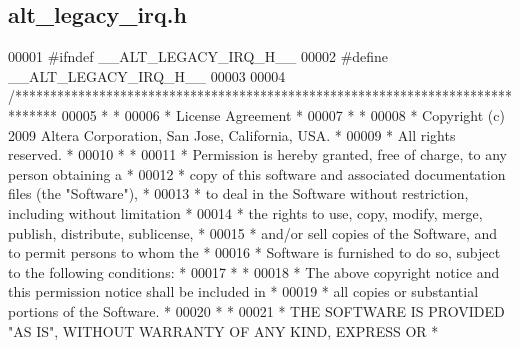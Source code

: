\subsection{alt\+\_\+legacy\+\_\+irq.\+h}
\label{alt__legacy__irq_8h_source}

\begin{DoxyCode}
00001 \textcolor{preprocessor}{#ifndef \_\_ALT\_LEGACY\_IRQ\_H\_\_}
00002 \textcolor{preprocessor}{#define \_\_ALT\_LEGACY\_IRQ\_H\_\_}
00003 
00004 \textcolor{comment}{/******************************************************************************}
00005 \textcolor{comment}{*                                                                             *}
00006 \textcolor{comment}{* License Agreement                                                           *}
00007 \textcolor{comment}{*                                                                             *}
00008 \textcolor{comment}{* Copyright (c) 2009 Altera Corporation, San Jose, California, USA.           *}
00009 \textcolor{comment}{* All rights reserved.                                                        *}
00010 \textcolor{comment}{*                                                                             *}
00011 \textcolor{comment}{* Permission is hereby granted, free of charge, to any person obtaining a     *}
00012 \textcolor{comment}{* copy of this software and associated documentation files (the "Software"),  *}
00013 \textcolor{comment}{* to deal in the Software without restriction, including without limitation   *}
00014 \textcolor{comment}{* the rights to use, copy, modify, merge, publish, distribute, sublicense,    *}
00015 \textcolor{comment}{* and/or sell copies of the Software, and to permit persons to whom the       *}
00016 \textcolor{comment}{* Software is furnished to do so, subject to the following conditions:        *}
00017 \textcolor{comment}{*                                                                             *}
00018 \textcolor{comment}{* The above copyright notice and this permission notice shall be included in  *}
00019 \textcolor{comment}{* all copies or substantial portions of the Software.                         *}
00020 \textcolor{comment}{*                                                                             *}
00021 \textcolor{comment}{* THE SOFTWARE IS PROVIDED "AS IS", WITHOUT WARRANTY OF ANY KIND, EXPRESS OR  *}

\end{DoxyCode}
